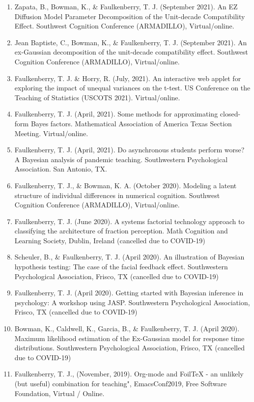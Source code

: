 \documentclass[article,10pt]{article}
\begin{document}
\begin{enumerate}
\item Zapata, B., Bowman, K., \& Faulkenberry, T. J. (September 2021). An EZ Diffusion Model Parameter Decomposition of the Unit-decade Compatibility Effect. Southwest Cognition Conference (ARMADILLO), Virtual/online.
\item Jean Baptiste, C., Bowman, K., \& Faulkenberry, T. J. (September 2021). An ex-Gaussian decomposition of the unit-decade compatibility effect. Southwest Cognition Conference (ARMADILLO), Virtual/online.
\item Faulkenberry, T. J. \& Horry, R. (July, 2021). An interactive web applet for exploring the impact of unequal variances on the t-test. US Conference on the Teaching of Statistics (USCOTS 2021). Virtual/online.
\item Faulkenberry, T. J. (April, 2021). Some methods for approximating closed-form Bayes factors. Mathematical Association of America Texas Section Meeting. Virtual/online.
\item Faulkenberry, T. J. (April, 2021). Do asynchronous students perform worse? A Bayesian analysis of pandemic teaching. Southwestern Psychological Association. San Antonio, TX.
\item Faulkenberry, T. J., \& Bowman, K. A. (October 2020). Modeling a latent structure of individual differences in numerical cognition. Southwest Cognition Conference (ARMADILLO), Virtual/online.
\item Faulkenberry, T. J. (June 2020). A systems factorial technology approach to classifying the architecture of fraction perception. Math Cognition and Learning Society, Dublin, Ireland (cancelled due to COVID-19)
\item Scheuler, B., \& Faulkenberry, T. J. (April 2020). An illustration of Bayesian hypothesis testing: The case of the facial feedback effect. Southwestern Psychological Association, Frisco, TX (cancelled due to COVID-19)
\item Faulkenberry, T. J. (April 2020). Getting started with Bayesian inference in psychology: A workshop using JASP. Southwestern Psychological Association, Frisco, TX (cancelled due to COVID-19)
\item Bowman, K., Caldwell, K., Garcia, B., \& Faulkenberry, T. J. (April 2020). Maximum likelihood estimation of the Ex-Gaussian model for response time distributions. Southwestern Psychological Association, Frisco, TX (cancelled due to COVID-19)
\item Faulkenberry, T. J., (November, 2019). Org-mode and FoilTeX - an unlikely (but useful) combination for teaching", EmacsConf2019, Free Software Foundation, Virtual / Online.

\end{enumerate}
\end{document}
